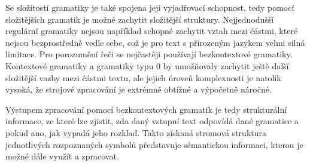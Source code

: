 Se složitostí gramatiky je také spojena její vyjadřovací schopnost, tedy pomocí složitějších gramatik je možné zachytit složitější struktury.
Nejjednodušší regulární gramatiky nejsou například schopné zachytit vztah mezi částmi, které nejsou bezprostředně vedle
sebe, což je pro text s přirozeným jazykem velmi silná limitace.
Pro porozumění řeči se nejčastěji používají bezkontextové gramatiky.
Kontextové gramatiky a gramatiky typu 0 by umožňovaly zachytit ještě další složitější vazby mezi částmi
textu, ale jejich úroveň komplexnosti je natolik vysoká,
že strojové zpracování je extrémně obtížné a výpočetně náročné.~\cite{PsutkaJ_2006_Mluvimes}

Výstupem zpracování pomocí bezkontextových gramatik je tedy strukturální informace, ze které lze zjistit,
zda daný vstupní text odpovídá dané gramatice a pokud ano, jak vypadá jeho rozklad.
Takto získaná stromová struktura jednotlivých rozpoznaných symbolů představuje sémantickou informaci,
kterou je možné dále využít a zpracovat.
